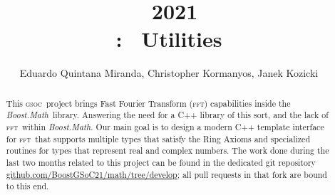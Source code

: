 \documentclass[11pt,a4paper]{article}
\title{\gsoc\ 2021\\\boostmath: \fft\ Utilities}
\author{Eduardo Quintana Miranda, Christopher Kormanyos, Janek Kozicki}
\newcommand{\fft}{\textsc{fft}}
\newcommand{\gsoc}{\textsc{gsoc}}
\newcommand{\boostmath}{\textit{Boost.Math}}
\begin{document}
\maketitle
\begin{abstract}
This \gsoc\ project brings Fast Fourier Transform (\fft) capabilities
inside the \boostmath\ library. Answering the need for a C++ library
of this sort, and the lack of \fft\ within \boostmath.
Our main goal is to design a modern C++ template interface for \fft\
that supports multiple types that satisfy the Ring Axioms and specialized
routines for types that represent real and complex numbers.
The work done during the last two months related to this project
can be found in the dedicated git
repository \url{github.com/BoostGSoC21/math/tree/develop}; all pull requests
in that fork are bound to this end.
\end{abstract}

\tableofcontents







    


\appendix

\end{document}

